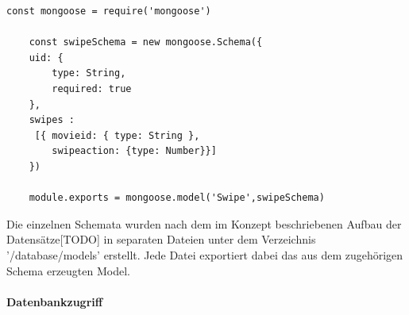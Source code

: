 \begin{lstlisting}[caption=Swipe Schema und Model, label=lst:modelswipe]
	const mongoose = require('mongoose')

	const swipeSchema = new mongoose.Schema({
    uid: {
        type: String,
        required: true
    },
    swipes :
     [{ movieid: { type: String },
        swipeaction: {type: Number}}]
	})

	module.exports = mongoose.model('Swipe',swipeSchema)
\end{lstlisting}

Die einzelnen Schemata wurden nach dem im Konzept beschriebenen Aufbau der Datensätze[TODO] in separaten Dateien unter dem Verzeichnis '/database/models' erstellt. Jede Datei exportiert dabei das aus dem zugehörigen Schema erzeugten Model.

\paragraph{Datenbankzugriff}
